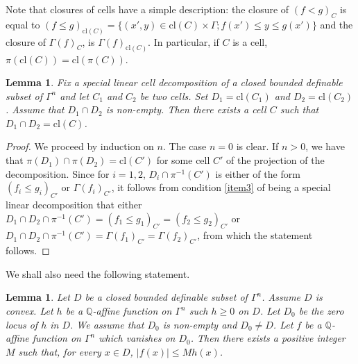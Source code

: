 \documentclass[10pt]{amsart}
\newtheorem{lemm}[subsection]{Lemma}
\theoremstyle{definition}
\theoremstyle{remark}
\newcommand{\cl}{\mathrm{cl}}
\newcommand{\Q}{\mathbb Q}
\theoremstyle{plain}
\theoremstyle{definition}
\begin{document}
Note that closures of cells have a simple description:
the closure of $(f < g)_C$ is equal to $(f \leq g)_{\cl (C)} = \{(x', y) \in \cl (C) \times \Gamma; f (x') \leq y \leq g(x')\}$ and the closure of
$\Gamma (f)_C$, is $\Gamma (f)_{\cl (C)}$.
In particular, if $C$ is a cell, $\pi (\cl (C)) = \cl (\pi (C))$.

\begin{lemm}\label{lemm:cell}Fix a special linear cell decomposition of a closed bounded definable subset of $\Gamma^n$ and let $C_1$ and $C_2$ be two cells. Set $D_1 = \cl (C_1)$ and
$D_2 = \cl (C_2)$. Assume that $D_1 \cap D_2$ is non-empty. Then there exists a cell $C$ such that
$D_1 \cap D_2 = \cl (C)$.
\end{lemm}

\begin{proof}We proceed by induction on $n$.
The case $n=0$ is clear. If $n >0$, we have
that $\pi (D_1) \cap \pi (D_2) = \cl (C')$ for some cell $C'$ of the projection of the decomposition.
Since for $i = 1, 2$, $D_i\cap \pi^{-1} (C')$ is either of the form
$(f_i \leq g_i)_{C'}$ or $\Gamma (f_i)_{C'}$, it follows from condition \eqref{item3} of being a special linear decomposition that either
$D_1 \cap D_2 \cap \pi^{-1} (C')
= (f_1\leq g_1)_{C'}
= (f_ 2\leq g_2)_{C'}$ or
$D_1 \cap D_2 \cap \pi^{-1} (C')
= \Gamma (f_1)_{C'} = \Gamma (f_2)_{C'}$, from which the statement follows.
\end{proof}

We shall also need the following statement.

\begin{lemm}\label{lemm:ineg}Let $D$ be a closed bounded definable subset of
$\Gamma^n$. Assume $D$ is convex. Let $h$ be a $\Q$-affine function on $\Gamma^n$ such $h \geq 0$ on $D$.
Let $D_0$ be the zero locus of $h$ in $D$. We assume that $D_0$ is non-empty and $D_0 \neq D$.
Let $f$ be a $\Q$-affine function on $\Gamma^n$ which vanishes on $D_0$. Then there exists a positive integer
$M$ such that, for every $x \in D$, $\vert f (x) \vert \leq M h (x)$.
\end{lemm}
\end{document}
